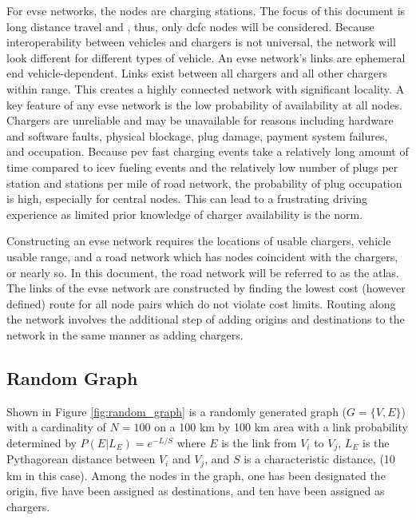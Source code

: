 \documentclass[12pt]{article}
\begin{document}
For \gls{evse} networks, the nodes are charging stations. The focus of this document is long distance travel and , thus, only \gls{dcfc} nodes will be considered. Because interoperability between vehicles and chargers is not universal, the network will look different for different types of vehicle. An \gls{evse} network's links are ephemeral end vehicle-dependent. Links exist between all chargers and all other chargers within range. This creates a highly connected network with significant locality. A key feature of any \gls{evse} network is the low probability of availability at all nodes. Chargers are unreliable and may be unavailable for reasons including hardware and software faults, physical blockage, plug damage, payment system failures, and occupation. Because \gls{pev} fast charging events take a relatively long amount of time compared to \gls{icev} fueling events and the relatively low number of plugs per station and stations per mile of road network, the probability of plug occupation is high, especially for central nodes. This can lead to a frustrating driving experience as limited prior knowledge of charger availability is the norm.

Constructing an \gls{evse} network requires the locations of usable chargers, vehicle usable range, and a road network which has nodes coincident with the chargers, or nearly so. In this document, the road network will be referred to as the atlas. The links of the \gls{evse} network are constructed by finding the lowest cost (however defined) route for all node pairs which do not violate cost limits. Routing along the network involves the additional step of adding origins and destinations to the network in the same manner as adding chargers.

\subsection*{Random Graph}

Shown in Figure \ref{fig:random_graph} is a randomly generated graph ($G = \{V, E\}$) with a cardinality of $N = 100$ on a 100 km by 100 km area with a link probability determined by $P(E|L_E) = e^{-L / S}$ where $E$ is the link from $V_i$ to $V_j$, $L_E$ is the Pythagorean distance between $V_i$ and $V_j$, and $S$ is a characteristic distance, (10 km in this case). Among the nodes in the graph, one has been designated the origin, five have been assigned as destinations, and ten have been assigned as chargers.
\end{document}

